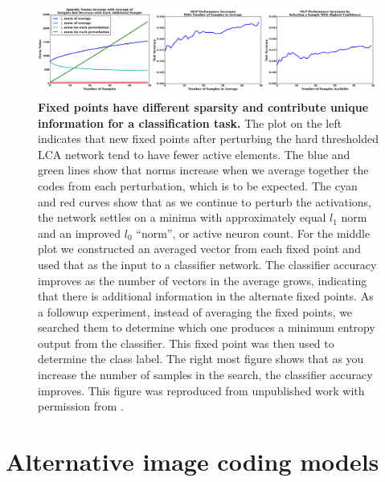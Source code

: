 \begin{figure}[h]
    \centering
    \includegraphics[width=\textwidth]{figures/lca_norms_acc.png}
    \caption{\textbf{Fixed points have different sparsity and contribute unique information for a classification task.} The plot on the left indicates that new fixed points after perturbing the hard thresholded LCA network tend to have fewer active elements. The blue and green lines show that norms increase when we average together the codes from each perturbation, which is to be expected. The cyan and red curves show that as we continue to perturb the activations, the network settles on a minima with approximately equal $l_{1}$ norm and an improved $l_{0}$ ``norm'', or active neuron count. For the middle plot we constructed an averaged vector from each fixed point and used that as the input to a classifier network. The classifier accuracy improves as the number of vectors in the average grows, indicating that there is additional information in the alternate fixed points. As a followup experiment, instead of averaging the fixed points, we searched them to determine which one produces a minimum entropy output from the classifier. This fixed point was then used to determine the class label. The right most figure shows that as you increase the number of samples in the search, the classifier accuracy improves. This figure was reproduced from unpublished work with permission from \parencite{shainin2016sampling}.}
    \label{fig:ch2_lca_norms_and_acc}
\end{figure}


\section{Alternative image coding models}\label{sec:ch2_alternative_image_coding_models}

%


